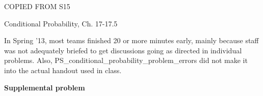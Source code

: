 \documentclass[handout]{mcs}
\begin{document}

\begin{staffnotes}
COPIED FROM S15

Conditional Probability, Ch. 17-17.5

In Spring '13, most teams finished 20 or more minutes early, mainly
because staff was not adequately briefed to get discussions going as
directed in individual problems.  Also,
PS\_conditional\_probability\_problem\_errors did not make it into the
actual handout used in class.
\end{staffnotes}







\begin{center}
\textbf{\large Supplemental problem}
\end{center}



\end{document}
